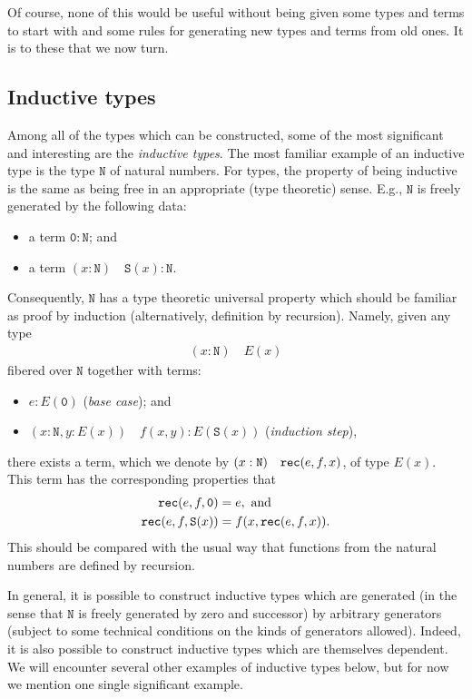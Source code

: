 \documentclass[11pt]{amsart}
\newcommand{\nat}{\mathtt{N}}
\newcommand{\zero}{\mathtt{0}}
\newcommand{\successor}{\mathtt{S}}
\newcommand{\rec}{\textnormal{\texttt{rec}}}
\newcommand{\judge}[2]{(#1)\quad #2}
\theoremstyle{definition}
\theoremstyle{remark}
\numberwithin{equation}{section}
\begin{document}
Of course, none of this would be useful without being given some
types and terms to start with and some rules for generating new types and terms
from old ones.  It is to these that we now turn.

\subsection{Inductive types}\label{sec:inductive_intro}

Among all of the types which can be constructed, some of the most
significant and interesting are the \emph{inductive types}.  The most
familiar example of an inductive type is the type $\nat$ of natural
numbers.  For types, the property of being inductive is the same as
being free in an appropriate (type theoretic) sense.  E.g., $\nat$ is
freely generated by the following data:
\begin{itemize}
\item a term $\zero:\nat$; and
\item a term $\judge{x:\nat}{\successor(x):\nat}$.
\end{itemize}
Consequently, $\nat$ has a type theoretic universal property which
should be familiar as proof by induction (alternatively, definition by
recursion).  Namely, given any type 
\begin{align*}
  \judge{x:\nat}{E(x)}
\end{align*}
fibered over $\nat$ together with terms:
\begin{itemize}
\item $e:E(\zero)$ (\emph{base case}); and
\item $\judge{x:\nat,y:E(x)}{f(x,y):E(\successor(x))}$
  (\emph{induction step}),
\end{itemize}
there exists a term, which we denote by
$\judge{x:\nat}{\rec(e,f,x)}$, of type $E(x)$.  This term has
the corresponding properties that 
\begin{align*}
  \rec(e,f,\zero) & = e,\text{ and}\\
  \rec(e,f,\successor(x)) & = f(x,\rec(e,f,x)).
\end{align*}
This should be compared with the usual way that functions from the
natural numbers are defined by recursion.

In general, it is possible to construct inductive types which are
generated (in the sense that $\nat$ is freely generated by zero and
successor) by arbitrary generators (subject to some technical
conditions on the kinds of generators allowed).  Indeed, it is also
possible to construct inductive types which
are themselves dependent.  We will encounter several other examples of inductive
types below, but for now we mention one single significant example.
\end{document}
